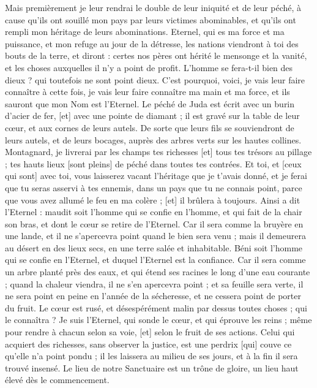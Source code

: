 \begin{multicols}{2}
Mais premièrement je leur rendrai le double de leur iniquité et de leur péché, à cause qu'ils ont souillé mon pays par leurs victimes abominables, et qu'ils ont rempli mon héritage de leurs abominations.
Eternel, qui es ma force et ma puissance, et mon refuge au jour de la détresse, les nations viendront à toi des bouts de la terre, et diront : certes nos pères ont hérité le mensonge et la vanité, et les choses auxquelles il n'y a point de profit.
L'homme se fera-t-il bien des dieux ? qui toutefois ne sont point dieux.
C'est pourquoi, voici, je vais leur faire connaître à cette fois, je vais leur faire connaître ma main et ma force, et ils sauront que mon Nom est l'Eternel.
\VerseOne{}Le péché de Juda est écrit avec un burin d’acier de fer, [et] avec une pointe de diamant ; il est gravé sur la table de leur cœur, et aux cornes de leurs autels.
De sorte que leurs fils se souviendront de leurs autels, et de leurs bocages, auprès des arbres verts sur les hautes collines.
Montagnard, je livrerai par les champs tes richesses [et] tous tes trésors au pillage ; tes hauts lieux [sont pleins] de péché dans toutes tes contrées.
Et toi, et [ceux qui sont] avec toi, vous laisserez vacant l'héritage que je t'avais donné, et je ferai que tu seras asservi à tes ennemis, dans un pays que tu ne connais point, parce que vous avez allumé le feu en ma colère ; [et] il brûlera à toujours.
Ainsi a dit l'Eternel : maudit soit l'homme qui se confie en l'homme, et qui fait de la chair son bras, et dont le cœur se retire de l'Eternel.
Car il sera comme la bruyère en une lande, et il ne s'apercevra point quand le bien sera venu ; mais il demeurera au désert en des lieux secs, en une terre salée et inhabitable.
Béni soit l'homme qui se confie en l'Eternel, et duquel l'Eternel est la confiance.
Car il sera comme un arbre planté près des eaux, et qui étend ses racines le long d'une eau courante ; quand la chaleur viendra, il ne s'en apercevra point ; et sa feuille sera verte, il ne sera point en peine en l'année de la sécheresse, et ne cessera point de porter du fruit.
Le cœur est rusé, et désespérément malin par dessus toutes choses ; qui le connaîtra ?
Je suis l'Eternel, qui sonde le cœur, et qui éprouve les reins ; même pour rendre à chacun selon sa voie, [et] selon le fruit de ses actions.
Celui qui acquiert des richesses, sans observer la justice, est une perdrix [qui] couve ce qu'elle n'a point pondu ; il les laissera au milieu de ses jours, et à la fin il sera trouvé insensé.
Le lieu de notre Sanctuaire est un trône de gloire, un lieu haut élevé dès le commencement.

\end{multicols}
